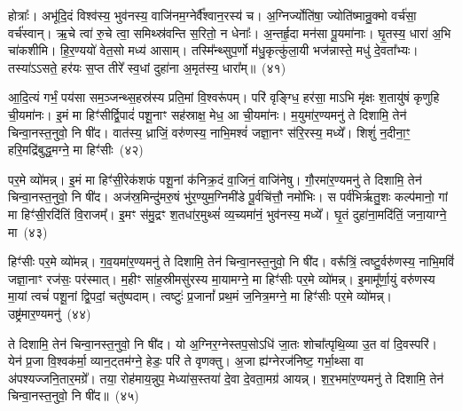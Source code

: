 होत्राः᳚। अभू॑दि॒दं विश्व॑स्य॒ भुव॑नस्य॒ वाजि॑नम॒ग्नेर्वै᳚श्वान॒रस्य॑ च। अ॒ग्निर्ज्योति॑षा॒ ज्योति॑ष्मान्रु॒क्मो वर्च॑सा॒ वर्च॑स्वान्। ऋ॒चे त्वा॑ रु॒चे त्वा॒ समिथ्स्र॑वन्ति स॒रितो॒ न धेनाः᳚। अ॒न्तर्\mbox{}हृ॒दा मन॑सा पू॒यमा॑नाः। घृ॒तस्य॒ धारा॑ अ॒भि चा॑कशीमि। हि॒र॒ण्ययो॑ वेत॒सो मध्य॑ आसाम्। तस्मि᳚न्थ्सुप॒र्णो म॑धु॒कृत्कु॑ला॒यी भज॑न्नास्ते॒ मधु॑ दे॒वता᳚भ्यः। तस्या॑\-ऽऽसते॒ हर॑यः स॒प्त तीरे᳚ स्व॒धां दुहा॑ना अ॒मृत॑स्य॒ धारा᳚म्॥~(४१)\ip

{\anuvakamend[{प्र॒ति॒ष्ठायै॑ स॒हस्र॑वीर्या पर॒मं वि॒राट्थ्स॒प्त तीरे॑ च॒त्वारि॑ च}]}

आ॒दि॒त्यं गर्भं॒ पय॑सा सम॒ञ्जन्थ्स॒हस्र॑स्य प्रति॒मां वि॒श्वरू॑पम्। परि॑ वृङ्ग्धि॒ हर॑सा॒ माऽभि मृ॑क्षः श॒तायु॑षं कृणुहि ची॒यमा॑नः। इ॒मं मा हिꣳ॑सीर्द्वि॒पादं॑ पशू॒नाꣳ सह॑स्राक्ष॒ मेध॒ आ ची॒यमा॑नः। म॒युमा॑र॒ण्यमनु॑ ते दिशामि॒ तेन॑ चिन्वा॒नस्त॒नुवो॒ नि षी॑द। वात॑स्य॒ ध्राजिं॒ वरु॑णस्य॒ नाभि॒मश्वं॑ जज्ञा॒नꣳ स॑रि॒रस्य॒ मध्ये᳚। शिशुं॑ न॒दीना॒ꣳ॒ हरि॒मद्रि॑बुद्ध॒मग्ने॒ मा हिꣳ॑सीः~(४२)\ip

पर॒मे व्यो॑मन्न्। इ॒मं मा हिꣳ॑सी॒रेक॑शफं पशू॒नां क॑निक्र॒दं वा॒जिनं॒ वाजि॑नेषु। गौ॒रमा॑र॒ण्यमनु॑ ते दिशामि॒ तेन॑ चिन्वा॒नस्त॒नुवो॒ नि षी॑द। अज॑स्र॒मिन्दु॑मरु॒षं भु॑र॒ण्युम॒ग्निमी॑डे पू॒र्वचि॑त्तौ॒ नमो॑भिः। स पर्व॑भिर्\mbox{}ऋतु॒शः कल्प॑मानो॒ गां मा हिꣳ॑सी॒रदि॑तिं वि॒राजम्᳚। इ॒मꣳ स॑मु॒द्रꣳ श॒तधा॑र॒मुथ्सं॑ व्य॒च्यमा॑नं॒ भुव॑नस्य॒ मध्ये᳚। घृ॒तं दुहा॑ना॒मदि॑तिं॒ जना॒याग्ने॒ मा~(४३)\ip

हिꣳ॑सीः पर॒मे व्यो॑मन्न्। ग॒व॒यमा॑र॒ण्यमनु॑ ते दिशामि॒ तेन॑ चिन्वा॒नस्त॒नुवो॒ नि षी॑द। वरू᳚त्रिं॒ त्वष्टु॒र्वरु॑णस्य॒ नाभि॒मविं॑ जज्ञा॒नाꣳ रज॑सः॒ पर॑स्मात्। म॒हीꣳ सा॑ह॒स्रीमसु॑रस्य मा॒यामग्ने॒ मा हिꣳ॑सीः पर॒मे व्यो॑मन्न्। इ॒मामू᳚र्णा॒युं वरु॑णस्य मा॒यां त्वचं॑ पशू॒नां द्वि॒पदां॒ चतु॑ष्पदाम्। त्वष्टुः॑ प्र॒जानां᳚ प्रथ॒मं ज॒नित्र॒मग्ने॒ मा हिꣳ॑सीः पर॒मे व्यो॑मन्न्। उष्ट्र॑मार॒ण्यमनु॑~(४४)\ip

ते दिशामि॒ तेन॑ चिन्वा॒नस्त॒नुवो॒ नि षी॑द। यो अ॒ग्निर॒ग्नेस्तप॒सो\-ऽधि॑ जा॒तः शोचा᳚त्पृथि॒व्या उ॒त वा॑ दि॒वस्परि॑। येन॑ प्र॒जा वि॒श्वक॑र्मा॒ व्यान॒ट्तम॑ग्ने॒ हेडः॒ परि॑ ते वृणक्तु। अ॒जा ह्य॑ग्नेरज॑निष्ट॒ गर्भा॒थ्सा वा अ॑पश्यज्जनि॒तार॒मग्रे᳚। तया॒ रोह॑माय॒न्नुप॒ मेध्या॑स॒स्तया॑ दे॒वा दे॒वता॒मग्र॑ आयन्न्। श॒र॒भमा॑र॒ण्यमनु॑ ते दिशामि॒ तेन॑ चिन्वा॒नस्त॒नुवो॒ नि षी॑द॥~(४५)\ip

{\anuvakamend[{अग्ने॒ मा हिꣳ॑सी॒रग्ने॒ मोष्ट्र॑मार॒ण्यमनु॑ शर॒भं नव॑ च}]}%

